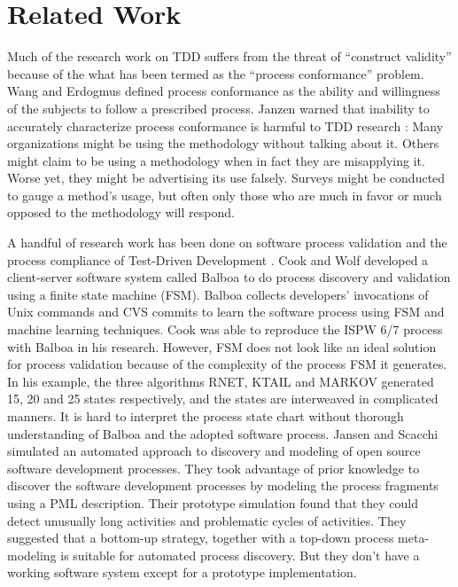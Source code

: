 \chapter{Related Work}
\label{chap:RelatedWork}
Much of the research work on TDD suffers from the threat of ``construct
validity'' \cite{Wang:04} because of the what has been termed as the
``process conformance'' problem. Wang and Erdogmus defined process
conformance as the ability and willingness of the subjects to follow a
prescribed process.  Janzen warned that inability to accurately
characterize process conformance is harmful to TDD research
\cite{Janzen:05}: Many organizations might be using the methodology without
talking about it.  Others might claim to be using a methodology when in
fact they are misapplying it. Worse yet, they might be advertising its use
falsely.  Surveys might be conducted to gauge a method's usage, but often
only those who are much in favor or much opposed to the methodology will
respond.

A handful of research work has been done on software process validation
\cite{Cook:95,Jensen:05} and the process compliance of Test-Driven
Development \cite{csdl2-06-02,Wang:04,Wege:04}.  Cook and Wolf
\cite{Cook:95} developed a client-server software system called Balboa to
do process discovery and validation using a finite state machine (FSM).
Balboa collects developers' invocations of Unix commands and CVS commits to
learn the software process using FSM and machine learning techniques. Cook was 
able to reproduce the ISPW
6/7 process with Balboa in his research.  However, FSM does not look like
an ideal solution for process validation because of the complexity of the
process FSM it generates. In his example, the three algorithms RNET, KTAIL
and MARKOV generated 15, 20 and 25 states respectively, and the states are
interweaved in complicated manners. It is hard to interpret the process
state chart without thorough understanding of Balboa and the adopted
software process. Jansen and Scacchi \cite{Jensen:05} simulated an
automated approach to discovery and modeling of open source software
development processes.  They took advantage of prior knowledge to discover
the software development processes by modeling the process fragments using
a PML description. Their prototype simulation found that they could detect
unusually long activities and problematic cycles of activities. They
suggested that a bottom-up strategy, together with a top-down process
meta-modeling is suitable for automated process discovery. But they don't
have a working software system except for a prototype implementation.

